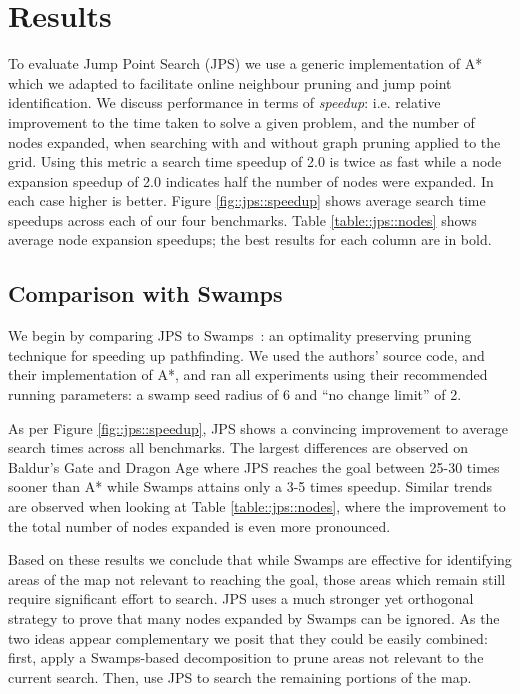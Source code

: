 \section{Results}
\label{cha::jps::results}

To evaluate Jump Point Search (JPS) we use a generic implementation of A*
which we adapted to facilitate online neighbour pruning and jump point
identification.  We discuss performance in terms of \emph{speedup}: i.e.
relative improvement to the time taken to solve a given problem, and the
number of nodes expanded, when searching with and without graph pruning
applied to the grid.  Using this metric a search time speedup of 2.0 is twice
as fast while a node expansion speedup of 2.0 indicates half the number of
nodes were expanded.  In each case higher is better.  Figure
\ref{fig::jps::speedup} shows average search time speedups across each of our
four benchmarks. Table \ref{table::jps::nodes} shows average node expansion
speedups; the best results for each column are in bold.



\subsection{Comparison with Swamps}
We begin by comparing JPS to Swamps~\citep{pochter10}: an optimality preserving
pruning technique for speeding up pathfinding.  We used the authors' source
code, and their implementation of A*, and ran all experiments using their
recommended running parameters: a swamp seed radius of 6 and ``no change
limit'' of 2.

As per Figure \ref{fig::jps::speedup}, JPS shows a convincing improvement to
average search times across all benchmarks.  The largest differences are
observed on Baldur's Gate and Dragon Age where JPS reaches the goal between
25-30 times sooner than A* while Swamps attains only a 3-5 times speedup.
Similar trends are observed when looking at Table \ref{table::jps::nodes},
where the improvement to the total number of nodes expanded is even more
pronounced.

Based on these results we conclude that while Swamps are effective for
identifying areas of the map not relevant to reaching the goal, those areas
which remain still require significant effort to search.  JPS uses a much
stronger yet orthogonal strategy to prove that many nodes expanded by Swamps
can be ignored.  As the two ideas appear complementary we posit that they
could be easily combined: first, apply a Swamps-based decomposition to prune
areas not relevant to the current search.  Then, use JPS to search the
remaining portions of the map.

